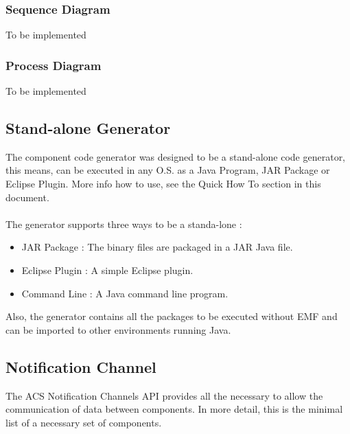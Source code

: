 \newpage

\subsubsection{Sequence Diagram}
To be implemented
\subsubsection{Process Diagram}
To be implemented

\subsection{Stand-alone Generator}
The component code generator was designed to be a stand-alone code generator,
this means, can be executed in any O.S. as a Java Program, JAR Package or
Eclipse Plugin. More info how to use, see the Quick How To section in this
document.\\
\\
The generator supports three ways to be a standa-lone :
\begin{itemize}
  \item JAR Package : The binary files are packaged in a JAR Java file.
  \item Eclipse Plugin : A simple Eclipse plugin.
  \item Command Line : A Java command line program.
\end{itemize}
Also, the generator contains all the packages to be executed without EMF and 
can be imported to other environments running Java.

\subsection{Notification Channel}

The ACS Notification Channels API provides all the necessary to allow the
communication of data between components. In more detail, this is the minimal
list of a necessary set of components.

